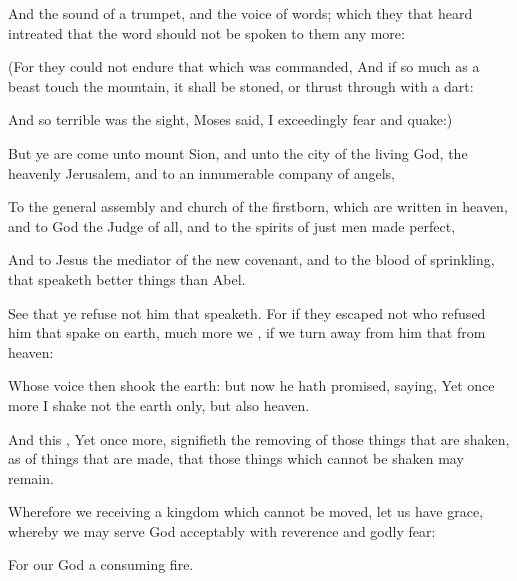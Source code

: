 {And the
sound of a
trumpet,
and the
voice of
words;
which
{} they that
heard
intreated
that the
word
should
not be
spoken to
them any more:

(For they
could
not
endure that which was
commanded, And if so much
as a
beast
touch the
mountain, it shall be
stoned,
or thrust
through with a
dart:

And
so
terrible
was the
sight,
{}
Moses
said,
I exceedingly
fear
and
quake:)

But ye are
come unto
mount
Sion,
and unto the
city of
the
living
God,
the
heavenly
Jerusalem,
and to an innumerable
company of
angels,

To the general
assembly
and
church of the
firstborn, which are
written
in
heaven,
and to
God the
Judge of
all,
and to the
spirits of just
men made
perfect,

And to
Jesus the
mediator of
the
new
covenant,
and to the
blood of
sprinkling, that
speaketh better
things
than
{}
Abel.

See
that
ye
refuse
not him that
speaketh.
For
if
they
escaped
not who
refused him that
spake
on
earth,
much
more
{}
we
{}, if we turn away
from him
that
{}
from
heaven:

Whose
voice
then
shook the
earth:
but
now he hath
promised,
saying,
Yet
once
more
I
shake
not the
earth
only,
but
also
heaven.

And
this
{},
Yet
once
more,
signifieth the
removing of those things that are
shaken,
as of things that are
made,
that those things
which
cannot be
shaken may
remain.

Wherefore we
receiving a
kingdom which cannot be
moved, let us
have
grace,
whereby we may
serve
God
acceptably
with
reverence
and godly
fear:

For
our
God
{}
a
consuming
fire.




\par }
